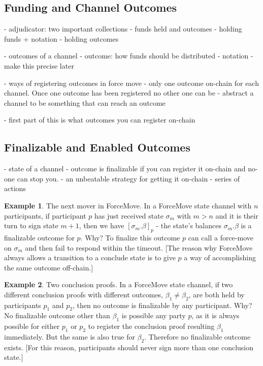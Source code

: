 \documentclass{article}
\theoremstyle{definition}
\newtheorem{example}{Example}[section]
\newcommand{\enf}[1]{[#1]}
\begin{document}
\subsection{Funding and Channel Outcomes}

- adjudicator: two important collections - funds held and outcomes
- holding funds + notation
- holding outcomes

- outcomes of a channel
- outcome: how funds should be distributed
- notation
- make this precise later


- ways of registering outcomes in force move
- only one outcome on-chain for each channel. Once one outcome has been registered no other one can be
- abstract a channel to be something that can reach an outcome

- first part of this is what outcomes you can register on-chain

\subsection{Finalizable and Enabled Outcomes}

- state of a channel
- outcome is finalizable if you can register it on-chain and no-one can stop you.
- an unbeatable strategy for getting it on-chain
- series of actions

\begin{example}{The next mover in ForceMove.}
  In a ForceMove state channel with $n$ participants, if participant $p$ has just received state $\sigma_m$ with $m > n$ and it is their turn to sign state $m+1$, then we have $\enf{\sigma_m.\beta}_p$ - the state's balances $\sigma_m.\beta$ is a finalizable outcome for $p$.
  Why? To finalize this outcome $p$ can call a force-move on $\sigma_m$ and then fail to respond within
  the timeout. [The reason why ForceMove always allows a transition to a conclude state is to
  give $p$ a way of accomplishing the same outcome off-chain.]
\end{example}

\begin{example}{Two conclusion proofs.}
  In a ForceMove state channel, if two different conclusion proofs with different outcomes,
  $\beta_1 \neq \beta_2$, are both held by participants $p_1$ and $p_2$, then no outcome is finalizable by any participant.
  Why? No finalizable outcome other than $\beta_1$ is possible any party $p$, as it is always
  possible for either $p_1$ or $p_2$ to register the conclusion proof resulting $\beta_1$ immediately.
  But the same is also true for $\beta_2$. Therefore no finalizable outcome exists.
  [For this reason, participants should never sign more than one conclusion state.]
\end{example}
\end{document}
